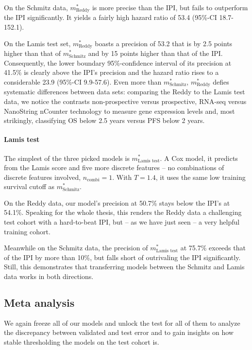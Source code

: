 On the Schmitz data, $m^*_\text{Reddy}$ is more precise than the IPI, but fails to outperform the 
IPI significantly. It yields a fairly high hazard ratio of \num{53.4} 
(\num{95}\%-CI \num{18.7}-\num{152.1}).

On the Lamis test set, $m^*_\text{Reddy}$ boasts a precision of \num{53.2} that is by \num{2.5} 
points higher than that of $m^*_\text{Schmitz}$ and by \num{15} points higher than that of the IPI. 
Consequently, the lower boundary \num{95}\%-confidence interval of its precision at \num{41.5}\% is 
clearly above the IPI's precision and the hazard ratio rises to a considerable \num{23.9}
(\num{95}\%-CI \num{9.9}-\num{57.6}). Even more than $m^*_\text{Schmitz}$, $m^*_\text{Reddy}$ 
defies systematic differences between data sets: comparing the Reddy to the Lamis test data, we 
notice the contrasts non-prospective versus prospective, 
RNA-seq versus NanoString nCounter technology to measure gene expression levels and, most strikingly, 
classifying OS below \num{2.5} years versus PFS below \num{2} years.

\paragraph{Lamis test}
The simplest of the three picked models is $m^*_\text{Lamis test}$. A Cox model, it predicts from 
the Lamis score and five more discrete features -- no combinations of discrete features involved, 
$n_\text{combi} = 1$. With $T = \num{1.4}$, it uses the same low training survival cutoff as 
$m^*_\text{Schmitz}$.

On the Reddy data, our model's precision at \num{50.7}\% stays below the IPI's at \num{54.1}\%. 
Speaking for the whole thesis, this renders the Reddy data a challenging test cohort with a 
hard-to-beat IPI, but -- as we have just seen -- a very helpful training cohort.

Meanwhile on the Schmitz data, the precision of $m^*_\text{Lamis test}$ at \num{75.7}\% exceeds that 
of the IPI by more than \num{10}\%, but falls short of outrivaling the IPI significantly. Still, 
this demonstrates that transferring models between the Schmitz and Lamis data works in both 
directions.

\subsection{Meta analysis}

We again freeze all of our models and unlock the test for all of them to analyze the discrepancy 
between validated and test error and to gain insights on how stable thresholding the models on the 
test cohort is.

